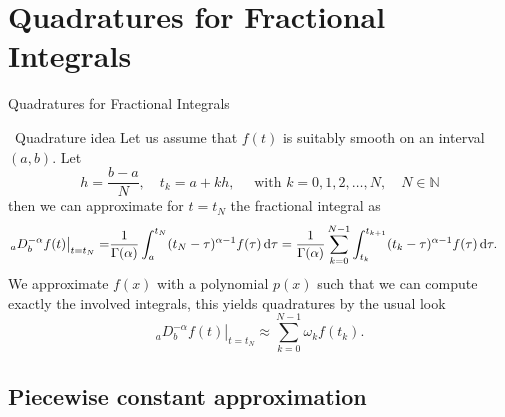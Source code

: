 \documentclass[aspectratio=169,xcolor=dvipsnames]{beamer}
\begin{document}
\section{Quadratures for Fractional Integrals}

\begin{frame}{Quadratures for Fractional Integrals}
\begin{block}{\faLightbulb[regular]\, Quadrature idea}
Let us assume that $f(t)$  is suitably smooth on an interval $(a,b)$. Let\vspace{-0.5em}
\[
h = \frac{b-a}{N}, \quad t_k = a + kh, \quad \text{ with } k=0,1,2,\ldots,N, \quad N \in \mathbb{N}
\]
\vspace{-0.5em}then we can approximate for $t = t_N$ the fractional integral as\vspace{-0.5em}
\[
\begin{split}
\left. {}_{a}D_{b}^{-\alpha} f(t)\right\rvert_{t = t_N} = & \frac{1}{\Gamma(\alpha)} \int_{a}^{t_N} (t_N - \tau)^{\alpha - 1} f(\tau)\,{\rm d}\tau %
= \frac{1}{\Gamma(\alpha)} \sum_{k=0}^{N-1} \int_{t_k}^{t_{k+1}} (t_k - \tau)^{\alpha-1} f(\tau)\,{\rm d}\tau.\vspace{-0.5em}
\end{split}
\]
We approximate $f(x)$ with a polynomial $p(x)$ such that we can compute exactly the involved integrals, this yields quadratures by the usual look\vspace{-0.5em}
\[
\left. {}_{a}D_{b}^{-\alpha} f(t)\right\rvert_{t = t_N}  \approx \sum_{k=0}^{N-1} \omega_k f(t_k).
\]
\end{block}

\end{frame}

\subsection{Piecewise constant approximation}
\end{document}
